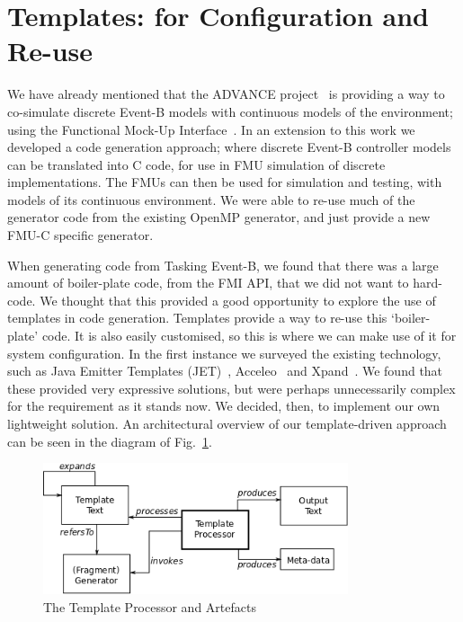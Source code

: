 \documentclass{llncs}%
\begin{document}
\section{Templates: for Configuration and Re-use}\label{templates}
%
We have already mentioned that the ADVANCE project~\cite{advance} is providing a way to co-simulate discrete Event-B models with continuous models of the environment; using the Functional Mock-Up Interface~\cite{FMISTD}. In an extension to this work we developed a code generation approach; where discrete Event-B controller models can be translated into C code, for use in FMU simulation of discrete implementations. The FMUs can then be used for simulation and testing, with models of its continuous environment. We were able to re-use much of the generator code from the existing OpenMP generator, and just provide a new FMU-C specific generator.  

When generating code from Tasking Event-B, we found that there was a large amount of boiler-plate code, from the FMI API, that we did not want to hard-code. We thought that this provided a good opportunity to explore the use of templates in code generation. Templates provide a way to re-use this `boiler-plate' code. It is also easily customised, so this is where we can make use of it for system configuration. In the first instance we surveyed the existing technology, such as Java Emitter Templates (JET)~\cite{JET}, Acceleo~\cite{acceleo} and Xpand~\cite{xpand}. We found that these provided very expressive solutions, but were perhaps unnecessarily complex for the requirement as it stands now. We decided, then, to implement our own lightweight solution. An architectural overview of our template-driven approach can be seen in the diagram of Fig.~\ref{fig:templates}.
%
\begin{figure}
\centering
\includegraphics[width=0.8\textwidth]{templateOverview.png}
\caption{The Template Processor and Artefacts}
\label{fig:templates}
\end{figure}
%
\end{document}
